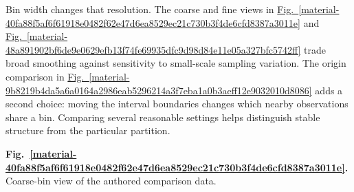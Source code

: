 \documentclass[11pt,a4paper]{article}
\begin{document}
\medskip

Bin width changes that resolution. The coarse and fine views in \hyperref[material-40fa88f5af6f61918e0482f62e47d6ea8529ec21c730b3f4de6cfd8387a3011e]{Fig.~\ref*{material-40fa88f5af6f61918e0482f62e47d6ea8529ec21c730b3f4de6cfd8387a3011e}} and \hyperref[material-48a891902bf6de9e0629efb13f74fe69935dfc9d98d84e11e05a327bfc5742ff]{Fig.~\ref*{material-48a891902bf6de9e0629efb13f74fe69935dfc9d98d84e11e05a327bfc5742ff}} trade broad smoothing against sensitivity to small-scale sampling variation. The origin comparison in \hyperref[material-9b8219b4da5a6a0164a2986eab5296214a3f7eba1a0b3aeff12e9032010d8086]{Fig.~\ref*{material-9b8219b4da5a6a0164a2986eab5296214a3f7eba1a0b3aeff12e9032010d8086}} adds a second choice: moving the interval boundaries changes which nearby observations share a bin. Comparing several reasonable settings helps distinguish stable structure from the particular partition.


\par\medskip
\Needspace{10cm}
\label{material-40fa88f5af6f61918e0482f62e47d6ea8529ec21c730b3f4de6cfd8387a3011e}
\noindent\textbf{Fig.~\ref*{material-40fa88f5af6f61918e0482f62e47d6ea8529ec21c730b3f4de6cfd8387a3011e}.} Coarse-bin view of the authored comparison data.\par\nopagebreak
\begin{center}
\end{center}

\medskip
\end{document}
